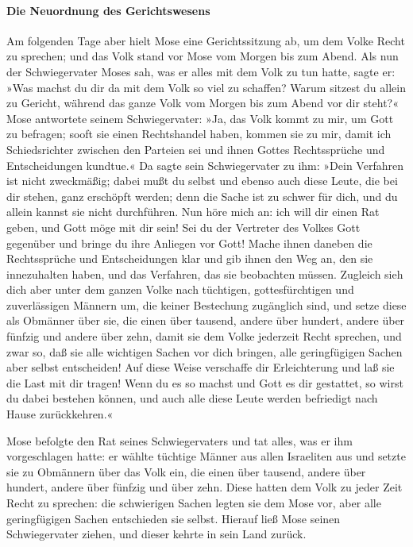 \hypertarget{die-neuordnung-des-gerichtswesens}{%
\paragraph{Die Neuordnung des
Gerichtswesens}\label{die-neuordnung-des-gerichtswesens}}

 Am folgenden Tage aber hielt Mose eine Gerichtssitzung
ab, um dem Volke Recht zu sprechen; und das Volk stand vor Mose vom
Morgen bis zum Abend.  Als nun der Schwiegervater Moses
sah, was er alles mit dem Volk zu tun hatte, sagte er: »Was machst du
dir da mit dem Volk so viel zu schaffen? Warum sitzest du allein zu
Gericht, während das ganze Volk vom Morgen bis zum Abend vor dir steht?«
 Mose antwortete seinem Schwiegervater: »Ja, das Volk
kommt zu mir, um Gott zu befragen;  sooft sie einen
Rechtshandel haben, kommen sie zu mir, damit ich Schiedsrichter zwischen
den Parteien sei und ihnen Gottes Rechtssprüche und Entscheidungen
kundtue.«  Da sagte sein Schwiegervater zu ihm: »Dein
Verfahren ist nicht zweckmäßig;  dabei mußt du selbst und
ebenso auch diese Leute, die bei dir stehen, ganz erschöpft werden; denn
die Sache ist zu schwer für dich, und du allein kannst sie nicht
durchführen.  Nun höre mich an: ich will dir einen Rat
geben, und Gott möge mit dir sein! Sei du der Vertreter des Volkes Gott
gegenüber und bringe du ihre Anliegen vor Gott!  Mache
ihnen daneben die Rechtssprüche und Entscheidungen klar und gib ihnen
den Weg an, den sie innezuhalten haben, und das Verfahren, das sie
beobachten müssen.  Zugleich sieh dich aber unter dem
ganzen Volke nach tüchtigen, gottesfürchtigen und zuverlässigen Männern
um, die keiner Bestechung zugänglich sind, und setze diese als Obmänner
über sie, die einen über tausend, andere über hundert, andere über
fünfzig und andere über zehn,  damit sie dem Volke
jederzeit Recht sprechen, und zwar so, daß sie alle wichtigen Sachen vor
dich bringen, alle geringfügigen Sachen aber selbst entscheiden! Auf
diese Weise verschaffe dir Erleichterung und laß sie die Last mit dir
tragen!  Wenn du es so machst und Gott es dir gestattet,
so wirst du dabei bestehen können, und auch alle diese Leute werden
befriedigt nach Hause zurückkehren.«

 Mose befolgte den Rat seines Schwiegervaters und tat
alles, was er ihm vorgeschlagen hatte:  er wählte
tüchtige Männer aus allen Israeliten aus und setzte sie zu Obmännern
über das Volk ein, die einen über tausend, andere über hundert, andere
über fünfzig und über zehn.  Diese hatten dem Volk zu
jeder Zeit Recht zu sprechen: die schwierigen Sachen legten sie dem Mose
vor, aber alle geringfügigen Sachen entschieden sie selbst.
 Hierauf ließ Mose seinen Schwiegervater ziehen, und
dieser kehrte in sein Land zurück.

